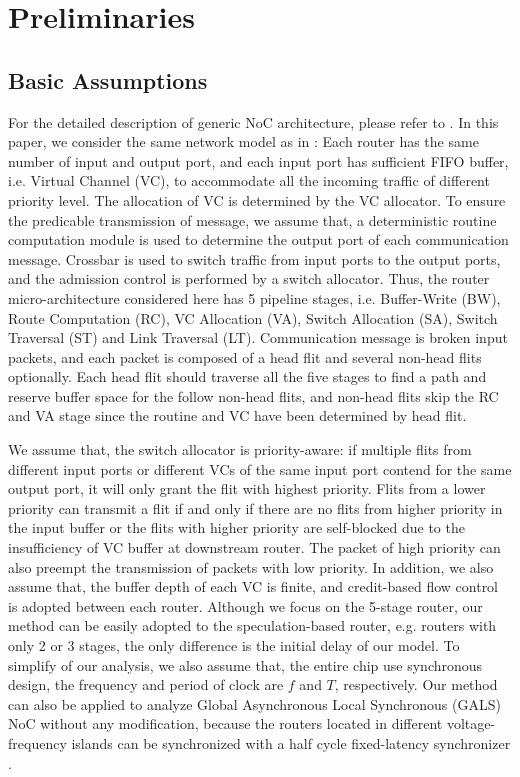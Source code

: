 \documentclass[10pt,journal]{IEEEtran}
\begin{document}
\section{Preliminaries}\label{model}
\subsection{Basic Assumptions}
For the detailed description of generic NoC architecture, please refer to \cite{jerger2009chip}. In this paper, we consider the same network model as in \cite{627905}\cite{Shi:2008:RCA:1397757.1397996}\cite{707545}\cite{73}: Each router has the same number of input and output port, and each input port has sufficient FIFO buffer, i.e. Virtual Channel (VC), to accommodate all the incoming traffic of different priority level. The allocation of VC is determined by the VC allocator. To ensure the predicable transmission of message, we assume that, a deterministic routine computation module is used to determine the output port of each communication message. Crossbar is used to switch traffic from input ports to the output ports, and the admission control is performed by a switch allocator. Thus, the router micro-architecture considered here has 5 pipeline stages, i.e. Buffer-Write (BW), Route Computation (RC), VC Allocation (VA), Switch Allocation (SA), Switch Traversal (ST) and Link Traversal (LT). Communication message is broken input packets, and each packet is composed of a head flit and several non-head flits optionally. Each head flit should traverse all the five stages to find a path and reserve buffer space for the follow non-head flits, and non-head flits skip the RC and VA stage since the routine and VC have been determined by head flit.

We assume that, the switch allocator is priority-aware: if multiple flits from different input ports or different VCs of the same input port contend for the same output port, it will only grant the flit with highest priority. Flits from a lower priority can transmit a flit if and only if there are no flits from higher priority in the input buffer or the flits with higher priority are self-blocked due to the insufficiency of VC buffer at downstream router. The packet of high priority can also preempt the transmission of packets with low priority. In addition, we also assume that, the buffer depth of each VC is finite, and credit-based flow control is adopted between each router. Although we focus on the 5-stage router, our method can be easily adopted to the speculation-based router, e.g. routers with only 2 or 3 stages, the only difference is the initial delay of our model. To simplify of our analysis, we also assume that, the entire chip use synchronous design, the frequency and period of clock are $f$ and $T$, respectively. Our method can also be applied to analyze Global Asynchronous Local Synchronous (GALS) NoC without any modification, because the routers located in different voltage-frequency islands can be synchronized with a half cycle fixed-latency synchronizer \cite{5476986}.
\end{document}
